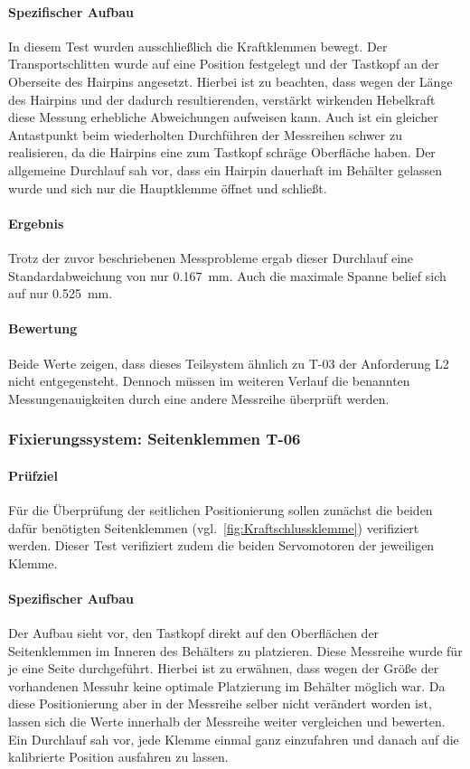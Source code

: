 \paragraph{Spezifischer Aufbau}
In diesem Test wurden ausschließlich die Kraftklemmen bewegt. Der Transportschlitten wurde auf eine Position festgelegt und der Tastkopf
an der Oberseite des Hairpins angesetzt. Hierbei ist zu beachten, dass wegen der Länge des Hairpins und der dadurch resultierenden,
verstärkt wirkenden Hebelkraft diese Messung erhebliche Abweichungen aufweisen kann. Auch ist ein gleicher Antastpunkt beim wiederholten
Durchführen der Messreihen schwer zu realisieren, da die Hairpins eine zum Tastkopf schräge Oberfläche haben.
Der allgemeine Durchlauf sah vor, dass ein Hairpin dauerhaft im Behälter gelassen wurde und sich nur die Hauptklemme öffnet und schließt.

\paragraph{Ergebnis}
Trotz der zuvor beschriebenen Messprobleme ergab dieser Durchlauf eine Standardabweichung von nur \qty{0.167}{\milli\meter}. Auch die
maximale Spanne belief sich auf nur \qty{0.525}{\milli\meter}.

\paragraph{Bewertung}
Beide Werte zeigen, dass dieses Teilsystem ähnlich zu T-03 der Anforderung L2 nicht entgegensteht. Dennoch müssen im weiteren Verlauf
die benannten Messungenauigkeiten durch eine andere Messreihe überprüft werden.

\subsubsection{Fixierungssystem: Seitenklemmen T-06}

\paragraph{Prüfziel}
Für die Überprüfung der seitlichen Positionierung sollen zunächst die beiden dafür benötigten Seitenklemmen (vgl.\ \cref{fig:Kraftschlussklemme}) verifiziert werden. 
Dieser Test verifiziert zudem die beiden Servomotoren der jeweiligen Klemme.

\paragraph{Spezifischer Aufbau}
Der Aufbau sieht vor, den Tastkopf direkt auf den Oberflächen der Seitenklemmen im Inneren des Behälters zu platzieren. Diese Messreihe wurde für je
eine Seite durchgeführt. Hierbei ist zu erwähnen, dass wegen der Größe der vorhandenen Messuhr keine optimale Platzierung im Behälter
möglich war. Da diese Positionierung aber in der Messreihe selber nicht verändert worden ist, lassen sich die Werte innerhalb der
Messreihe weiter vergleichen und bewerten. Ein Durchlauf sah vor, jede Klemme einmal ganz einzufahren und danach auf die kalibrierte
Position ausfahren zu lassen.

